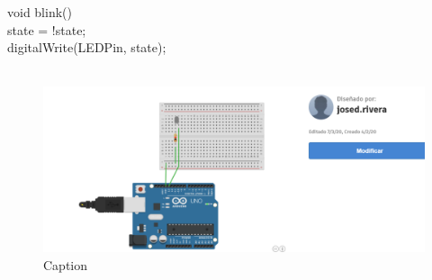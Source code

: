 \documentclass[12pt]{article}
\begin{document}
void blink() {\\
   state = !state;\\
   digitalWrite(LEDPin, state);\\
}
\
\begin{figure}
    \centering
    \includegraphics{interrumpcion.png}
    \caption{Caption}
    \label{fig:my_label}
\end{figure}

    

\end{document}
